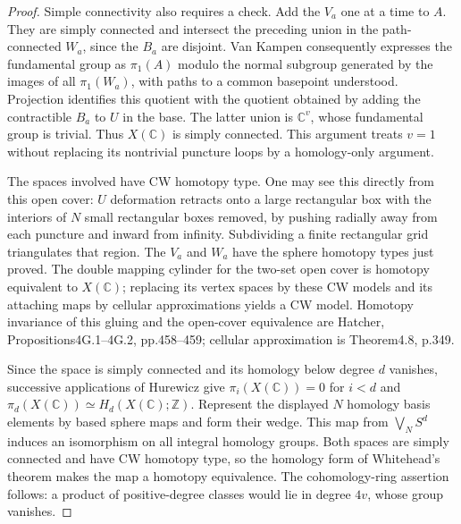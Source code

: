 \begin{proof}
Simple connectivity also requires a check. Add the $V_a$ one at a
time to $A$. They are simply connected and intersect the preceding
union in the path-connected $W_a$, since the $B_a$ are disjoint.
Van Kampen consequently expresses the fundamental group as
$\pi_1(A)$ modulo the normal subgroup generated by the images of
all $\pi_1(W_a)$, with paths to a common basepoint understood.
Projection identifies this quotient with the quotient obtained by
adding the contractible $B_a$ to $U$ in the base. The latter union
is $\mathbb C^v$, whose fundamental group is trivial. Thus
$X(\mathbb C)$ is simply connected. This argument treats $v=1$
without replacing its nontrivial puncture loops by a homology-only
argument.

The spaces involved have CW homotopy type. One may see this directly
from this open cover: $U$ deformation retracts onto a large
rectangular box with the interiors of $N$ small rectangular boxes
removed, by pushing radially away from each puncture and inward
from infinity. Subdividing a finite rectangular grid triangulates
that region. The $V_a$ and $W_a$ have the sphere homotopy types just
proved. The double mapping cylinder for the two-set open cover is
homotopy equivalent to $X(\mathbb C)$; replacing its vertex spaces
by these CW models and its attaching maps by cellular
approximations yields a CW model. Homotopy invariance of this gluing
and the open-cover equivalence are Hatcher, Propositions4G.1--4G.2,
pp.458--459; cellular approximation is Theorem4.8, p.349.

Since the space is simply connected and its homology below degree
$d$ vanishes, successive applications of Hurewicz give
$\pi_i(X(\mathbb C))=0$ for $i<d$ and
$\pi_d(X(\mathbb C))\simeq H_d(X(\mathbb C);\mathbb Z)$.
Represent the displayed $N$ homology basis elements by based sphere
maps and form their wedge. This map from $\bigvee_N S^d$ induces an
isomorphism on all integral homology groups. Both spaces are simply
connected and have CW homotopy type, so the homology form of
Whitehead's theorem makes the map a homotopy equivalence.
The cohomology-ring assertion follows: a product of positive-degree
classes would lie in degree $4v$, whose group vanishes.


\end{proof}
